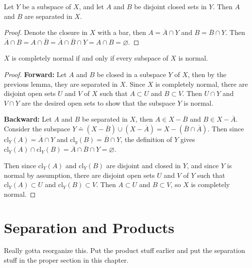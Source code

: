 \documentclass[10pt]{report}
\begin{document}
\begin{lem}
	Let $Y$ be a subspace of $X$, and let $A$ and $B$ be disjoint closed sets in $Y$. Then $A$ and $B$ are separated in $X$.
\end{lem}
\begin{proof}
	Denote the closure in $X$ with a bar, then $A=\overline{A} \cap Y$ and $B = \overline{B}\cap Y$. Then $\overline{A} \cap B = A \cap \overline{B}= \overline{A}\cap \overline{B}\cap Y = A \cap B = \varnothing$.
\end{proof}

\begin{prop}
$X$ is completely normal if and only if every subspace of $X$ is normal.
\end{prop}
\begin{proof}
\textbf{Forward:} Let $A$ and $B$ be closed in a subspace $Y$ of $X$, then by the previous lemma, they are separated in $X$. Since $X$ is completely normal, there are disjoint open sets $U$ and $V$ of $X$ such that $A \subset U$ and $B \subset V$. Then $U \cap Y$ and $V\cap Y$ are the desired open sets to show that the subspace $Y$ is normal.

\textbf{Backward:} Let $A$ and $B$ be separated in $X$, then $A \in X- \overline{B}$ and $B \in X-\overline{A}$. Consider the subspace $Y \doteq (X-\overline{B}) \cup (X-\overline{A}) = X - (\overline{B} \cap \overline{A})$. Then since $\text{cl}_Y(A) = \overline{A}\cap Y$ and $\text{cl}_y(B) = \overline{B}\cap Y$, the definition of $Y$ gives $\text{cl}_Y(A) \cap \text{cl}_Y(B) = \overline{A} \cap \overline{B} \cap Y = \varnothing$.

Then since $\text{cl}_Y(A)$ and $\text{cl}_Y(B)$ are disjoint and closed in $Y$, and since $Y$ is normal by assumption, there are disjoint open sets $U$ and $V$ of $Y$ such that $\text{cl}_Y(A) \subset U$ and $\text{cl}_Y(B) \subset V$. Then $A \subset U$ and $B \subset V$, so $X$ is completely normal.
\end{proof}



\section{Separation and Products}

{\color{red}Really gotta reorganize this. Put the product stuff earlier and put the separation stuff in the proper section in this chapter.}
\end{document}
